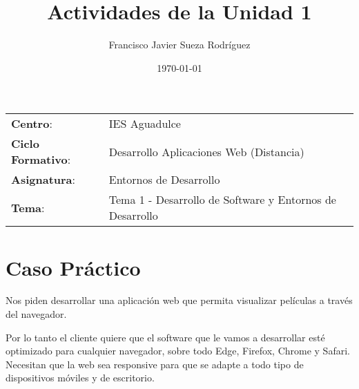 


\title{
    \vspace{10ex}
    \normalfont \normalsize
    \huge \textbf{Actividades de la Unidad 1}
}
\author{Francisco Javier Sueza Rodríguez}
\date{\normalsize\today}



\maketitle

\thispagestyle{empty}

\vspace{75ex}

\begin{center}
    \begin{tabular}{l l}
        \textbf{Centro}: & IES Aguadulce \\
        \textbf{Ciclo Formativo}: & Desarrollo Aplicaciones Web (Distancia)\\
        \textbf{Asignatura}: & Entornos de Desarrollo\\
       \textbf{Tema}: & Tema 1 - Desarrollo de Software y Entornos de Desarrollo\\
    \end{tabular}
\end{center}

\newpage

\vspace{10ex}

\section{Caso Práctico}
Nos piden desarrollar una aplicación web que permita visualizar películas a través del navegador.

Por lo tanto el cliente quiere que el software que le vamos a desarrollar esté optimizado para cualquier navegador, sobre todo Edge, Firefox, Chrome y Safari. Necesitan que la web sea responsive para que se adapte a todo tipo de dispositivos móviles y de escritorio.


